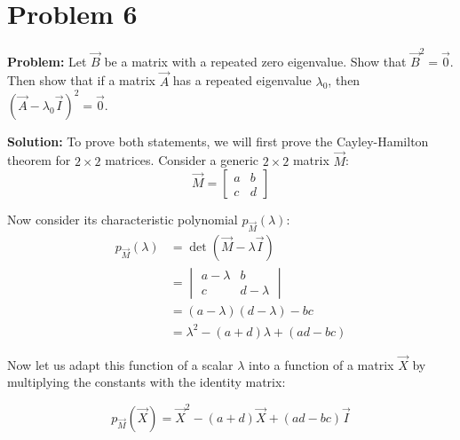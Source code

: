 \documentclass{article}
\begin{document}
\section*{Problem 6}
\noindent\textbf{Problem:} Let $\vec B$ be a matrix with a repeated zero eigenvalue. Show that $\vec B^2=\vec 0$. Then show that if a matrix $\vec A$ has a repeated eigenvalue $\lambda_0$, then $(\vec A-\lambda_0\vec I)^2=\vec 0$.
\bigskip

\noindent\textbf{Solution:} To prove both statements, we will first prove the Cayley-Hamilton theorem for $2\times2$ matrices. Consider a generic $2\times2$ matrix $\vec M$:
\begin{equation*}
  \vec M=\begin{bmatrix}
    a&b\\c&d
  \end{bmatrix}
\end{equation*}

Now consider its characteristic polynomial $p_{\vec M}(\lambda)$:
\begin{align*}
  p_{\vec M}(\lambda)&=\det(\vec M-\lambda \vec I)\\
  &=\begin{vmatrix} a-\lambda & b \\ c & d-\lambda \end{vmatrix}\\
  &=(a-\lambda)(d-\lambda)-bc\\
  &=\lambda^2-(a+d)\lambda+(ad-bc)
\end{align*}

Now let us adapt this function of a scalar $\lambda$ into a function of a matrix $\vec X$ by multiplying the constants with the identity matrix:

\begin{equation*}
  p_{\vec M}(\vec X)=\vec X^2-(a+d)\vec X+(ad-bc)\vec I
\end{equation*}
\smallskip
\end{document}
